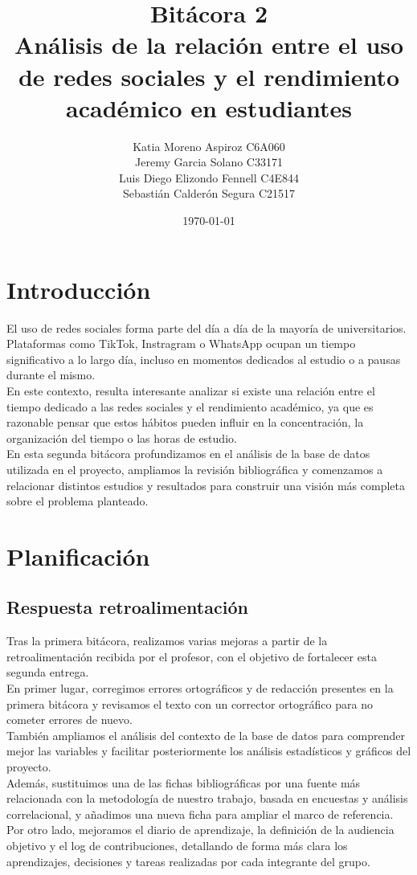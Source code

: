 \documentclass[12pt]{article}
\title{\Huge Bitácora 2\\ \Large Análisis de la relación entre el uso de redes sociales y el rendimiento académico en estudiantes}
\author{Katia Moreno Aspiroz C6A060\\
Jeremy Garcia Solano C33171\\
Luis Diego Elizondo Fennell C4E844\\
Sebastián Calderón Segura C21517}
\date{\today}
\begin{document}
\maketitle
\newpage

\tableofcontents
\newpage

\section{Introducción}
El uso de redes sociales forma parte del día a día de la mayoría de universitarios. Plataformas como TikTok, Instragram o WhatsApp ocupan un tiempo significativo a lo largo día, incluso en momentos dedicados al estudio o a pausas durante el mismo.
\\
En este contexto, resulta interesante analizar si existe una relación entre el tiempo dedicado a las redes sociales y el rendimiento académico, ya que es razonable pensar que estos hábitos pueden influir en la concentración, la organización del tiempo o las horas de estudio.
\\
En esta segunda bitácora profundizamos en el análisis de la base de datos utilizada en el proyecto, ampliamos la revisión bibliográfica y comenzamos a relacionar distintos estudios y resultados para construir una visión más completa sobre el problema planteado.
\section{Planificación}
\subsection{Respuesta retroalimentación}
Tras la primera bitácora, realizamos varias mejoras a partir de la retroalimentación recibida por el profesor, con el objetivo de fortalecer esta segunda entrega.
\\
En primer lugar, corregimos errores ortográficos y de redacción presentes en la primera bitácora y revisamos el texto con un corrector ortográfico para no cometer errores de nuevo.
\\
También ampliamos el análisis del contexto de la base de datos para comprender mejor las variables y facilitar posteriormente los análisis estadísticos y gráficos del proyecto.
\\
Además, sustituimos una de las fichas bibliográficas por una fuente más relacionada con la metodología de nuestro trabajo, basada en encuestas y análisis correlacional, y añadimos una nueva ficha para ampliar el marco de referencia.
\\
Por otro lado, mejoramos el diario de aprendizaje, la definición de la audiencia objetivo y el log de contribuciones, detallando de forma más clara los aprendizajes, decisiones y tareas realizadas por cada integrante del grupo.
\end{document}
